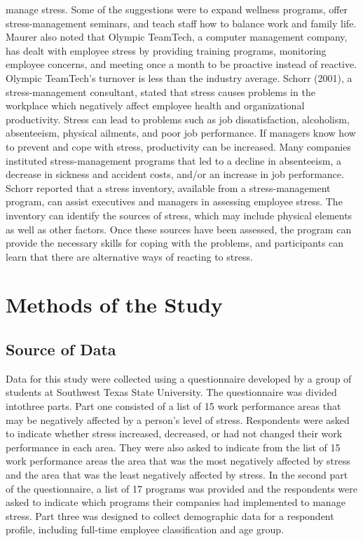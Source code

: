 \documentclass[]{article}
\begin{document}
manage stress. Some of the suggestions were to expand wellness programs, offer
stress-management seminars, and teach staff how to balance work and family life.
Maurer also noted that Olympic TeamTech, a computer management company, has
dealt with employee stress by providing training programs, monitoring employee
concerns, and meeting once a month to be proactive instead of reactive. Olympic
TeamTech's turnover is less than the industry average.
Schorr (2001), a stress-management consultant, stated that stress causes
problems in the workplace which negatively affect employee health and organizational
productivity. Stress can lead to problems such as job dissatisfaction, alcoholism,
absenteeism, physical ailments, and poor job performance. If managers know how to
prevent and cope with stress, productivity can be increased. Many companies
instituted stress-management programs that led to a decline in absenteeism, a decrease
in sickness and accident costs, and/or an increase in job performance. Schorr reported
that a stress inventory, available from a stress-management program, can assist
executives and managers in assessing employee stress. The inventory can identify the
sources of stress, which may include physical elements as well as other factors. Once
these sources have been assessed, the program can provide the necessary skills for
coping with the problems, and participants can learn that there are alternative ways of
reacting to stress.

\section{Methods of the Study}
\subsection{Source of Data}
Data for this study were collected using a questionnaire developed by a group of
students at Southwest Texas State University. The questionnaire was divided intothree parts. Part one consisted of a list of 15 work performance areas that may be
negatively affected by a person's level of stress. Respondents were asked to indicate
whether stress increased, decreased, or had not changed their work performance in
each area. They were also asked to indicate from the list of 15 work performance areas
the area that was the most negatively affected by stress and the area that was the least
negatively affected by stress. In the second part of the questionnaire, a list of 17
programs was provided and the respondents were asked to indicate which programs
their companies had implemented to manage stress. Part three was designed to collect
demographic data for a respondent profile, including full-time employee classification
and age group.
\end{document}
